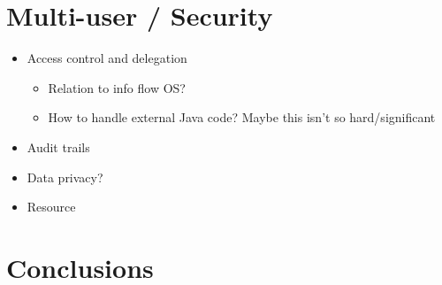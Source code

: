 \documentclass{sig-alternate}
\begin{document}
\section{Multi-user / Security}
\begin{itemize}
\item
  Access control and delegation
  \begin{itemize}
  \item
    Relation to info flow OS?
  \item
    How to handle external Java code? Maybe this isn't so hard/significant
  \end{itemize}
\item
  Audit trails
\item
  Data privacy?
\item
  Resource
\end{itemize}
\section{Conclusions}



\end{document}
